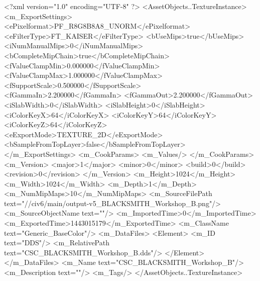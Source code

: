 <?xml version="1.0" encoding="UTF-8" ?>
<AssetObjects..TextureInstance>
	<m_ExportSettings>
		<ePixelformat>PF_R8G8B8A8_UNORM</ePixelformat>
		<eFilterType>FT_KAISER</eFilterType>
		<bUseMips>true</bUseMips>
		<iNumManualMips>0</iNumManualMips>
		<bCompleteMipChain>true</bCompleteMipChain>
		<fValueClampMin>0.000000</fValueClampMin>
		<fValueClampMax>1.000000</fValueClampMax>
		<fSupportScale>0.500000</fSupportScale>
		<fGammaIn>2.200000</fGammaIn>
		<fGammaOut>2.200000</fGammaOut>
		<iSlabWidth>0</iSlabWidth>
		<iSlabHeight>0</iSlabHeight>
		<iColorKeyX>64</iColorKeyX>
		<iColorKeyY>64</iColorKeyY>
		<iColorKeyZ>64</iColorKeyZ>
		<eExportMode>TEXTURE_2D</eExportMode>
		<bSampleFromTopLayer>false</bSampleFromTopLayer>
	</m_ExportSettings>
	<m_CookParams>
		<m_Values/>
	</m_CookParams>
	<m_Version>
		<major>1</major>
		<minor>0</minor>
		<build>0</build>
		<revision>0</revision>
	</m_Version>
	<m_Height>1024</m_Height>
	<m_Width>1024</m_Width>
	<m_Depth>1</m_Depth>
	<m_NumMipMaps>10</m_NumMipMaps>
	<m_SourceFilePath text="//civ6/main/output\blacksmith-v5\Textures\CSC_BLACKSMITH_Workshop_B.png"/>
	<m_SourceObjectName text=""/>
	<m_ImportedTime>0</m_ImportedTime>
	<m_ExportedTime>1443015179</m_ExportedTime>
	<m_ClassName text="Generic_BaseColor"/>
	<m_DataFiles>
		<Element>
			<m_ID text="DDS"/>
			<m_RelativePath text="CSC_BLACKSMITH_Workshop_B.dds"/>
		</Element>
	</m_DataFiles>
	<m_Name text="CSC_BLACKSMITH_Workshop_B"/>
	<m_Description text=""/>
	<m_Tags/>
</AssetObjects..TextureInstance>

